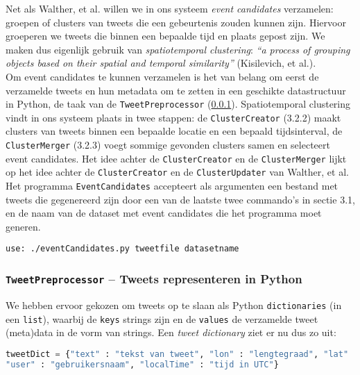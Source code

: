 \documentclass[a4paper,10pt,titlepage]{article}
\def\vl{\\[9pt]}                              %
\def\sss{\subsubsection}                      %
\def\ttt{\texttt}                             %
\def\it{\textit}                              %
\begin{document}
{{Net als Walther, et al. willen we in ons systeem \it{event candidates} verzamelen: 
groepen of clusters van tweets die een gebeurtenis zouden kunnen zijn. Hiervoor 
groeperen we tweets die binnen een bepaalde tijd en plaats gepost zijn. We maken 
dus eigenlijk gebruik van \it{spatiotemporal clustering}: \it{“a process of grouping 
objects based on their spatial and temporal similarity”} (Kisilevich, et al.). 
\vl
Om event candidates te kunnen verzamelen is het van belang om eerst de 
verzamelde tweets en hun metadata om te zetten in een geschikte datastructuur in 
Python, de taak van de \ttt{Tweet\-Pre\-pro\-ces\-sor} (\ref{TweetPreprocessor}). Spatiotemporal clustering 
vindt in ons systeem plaats in twee stappen: de \ttt{ClusterCreator} (3.2.2) maakt 
clusters van tweets binnen een bepaalde locatie en een bepaald tijdsinterval, de 
\ttt{ClusterMerger} (3.2.3) voegt sommige gevonden clusters samen en selecteert event 
candidates.  Het idee achter de \ttt{ClusterCreator} en de \ttt{ClusterMerger} lijkt op het 
idee achter de \ttt{ClusterCreator} en de \ttt{ClusterUpdater} van Walther, et al.
\vl
Het programma \ttt{EventCandidates} accepteert als argumenten een bestand met tweets 
die gegenereerd zijn door een van de laatste twee commando's in sectie 3.1, en 
de naam van de dataset met event candidates die het programma moet generen.

\begin{lstlisting}
use: ./eventCandidates.py tweetfile datasetname
\end{lstlisting}
\vspace*{-10pt}

\sss{\ttt{TweetPreprocessor} – Tweets representeren in Python}\label{TweetPreprocessor}

We hebben ervoor gekozen om tweets op te slaan als Python \ttt{dictionaries} (in een 
\ttt{list}), waarbij de \ttt{keys} strings zijn en de \ttt{values} de verzamelde tweet (meta)data 
in de vorm van strings. Een \it{tweet dictionary} ziet er nu dus zo uit:

\begin{lstlisting}[language=Python]
tweetDict = {"text" : "tekst van tweet", "lon" : "lengtegraad", "lat" : "breedtegraad", 
"user" : "gebruikersnaam", "localTime" : "tijd in UTC"}
\end{lstlisting}

}}
\end{document}
